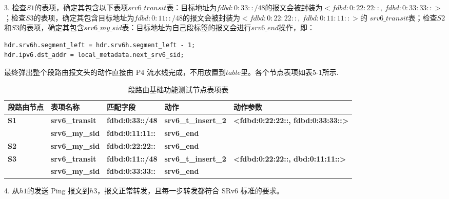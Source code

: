 3. 检查$S1$的表项，确定其包含以下表项$srv6\_transit$表：目标地址为$fdbd:0:33::/48$的报文会被封装为$<fdbd:0:22:22::,\ fdbd:0:33:33::>$；检查$S3$的表项，确定其包含目标地址为$fdbd:0:11::/48$的报文会被封装为$<fdbd:0:22:22::,\ fdbd:0:11:11::>$的 $srv6\_transit$表；检查$S2$和$S3$的表项，确定其包含$srv6\_my\_sid$表：目标地址为自己段标签的报文会进行$srv6\_end$操作，即：

\begin{lstlisting}
hdr.srv6h.segment_left = hdr.srv6h.segment_left - 1;
hdr.ipv6.dst_addr = local_metadata.next_srv6_sid;
\end{lstlisting}


最终弹出整个段路由报文头的动作直接由 \gls*{P4} 流水线完成，不用放置到$table$里。各个节点表项如表5-1所示.

\begin{table}[]
\begin{tabular}{|l|l|l|l|l|}
\hline
段路由节点 & 表项名称 & 匹配字段 & 动作 & 动作参数 \\ \hline
\multirow{2}{*}{\textbf{S1}} & \textbf{srv6\_transit} & \textbf{fdbd:0:33::/48} & \textbf{srv6\_t\_insert\_2} & \textbf{\textless{}fdbd:0:22:22::, fdbd:0:33:33::\textgreater{}} \\ \cline{2-5} 
    & \textbf{srv6\_my\_sid} & \textbf{fdbd:0:11:11::} & \textbf{srv6\_end} &  \\ \hline
\textbf{S2} & \textbf{srv6\_my\_sid} & \textbf{fdbd:0:22:22::} & \textbf{srv6\_end} &  \\ \hline
\multirow{2}{*}{\textbf{S3}} & \textbf{srv6\_transit} & \textbf{fdbd:0:11::/48} & \textbf{srv6\_t\_insert\_2} & \textbf{\textless{}fdbd:0:22:22::, dbd:0:11:11::\textgreater{}} \\ \cline{2-5} 
    & \textbf{srv6\_my\_sid} & \textbf{fdbd:0:33:33::} & \textbf{srv6\_end} &  \\ \hline
\end{tabular}
\caption{段路由基础功能测试节点表项表}
\label{table-sr-entries}
\end{table}

4. 从$h1$的发送 \gls*{Ping} 报文到$h3$，报文正常转发，且每一步转发都符合 \gls*{SRv6} \cite{SRARK} 标准的要求。

